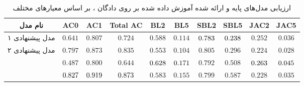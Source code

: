 \begin{table}[!htb]
	\centering
	\caption{
		ارزیابی مدل‌های پایه و ارائه شده آموزش داده شده بر روی دادگان ، بر اساس معیار‌های مختلف}
	\label{table:mr15_result}
	\small\tabcolsep=0.07cm
	\begin{tabular}{||c||c c c|c c|c c|c c||}\hline\hline نام مدل & AC0                        & AC1                        & Total AC                   & BL2                        & BL5                        & SBL2                       & SBL5                       & JAC2                       & JAC5                       \\
		\hline\hline
		مدل پیشنهادی ۱
		                                               & $0.641$                    & $0.807$                    & $0.724$                    & $0.588$                    & $0.114$                    & $\cellcolor{gray!25}0.783$ & $\cellcolor{gray!25}0.238$ & $0.252$                    & $0.036$                    \\
		\hline
		مدل پیشنهادی ۲
		                                               & $0.797$                    & $0.873$                    & $0.835$                    & $0.553$                    & $0.104$                    & $0.805$                    & $0.296$                    & $0.224$                    & $0.028$                    \\
		\hline
		\towardctg{}                                   & $0.487$                    & $0.800$                    & $0.644$                    & $\cellcolor{gray!25}0.628$ & $\cellcolor{gray!25}0.171$ & $0.792$                    & $0.508$                    & $\cellcolor{gray!25}0.263$ & $\cellcolor{gray!25}0.045$ \\
		\hline
		\sentigan{}                                    & $\cellcolor{gray!25}0.827$ & $\cellcolor{gray!25}0.919$ & $\cellcolor{gray!25}0.873$ & $0.583$                    & $0.155$                    & $0.799$                    & $0.587$                    & $0.228$                    & $0.035$                    \\
		\hline
		\hline\end{tabular}\normalsize
\end{table}


